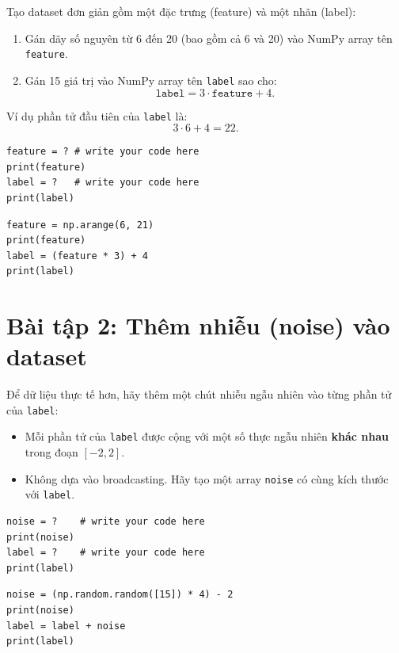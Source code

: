 \documentclass[12pt,a4paper]{article}
\begin{document}
\begin{phuongphap}[title={Yêu cầu bài tập}]
Tạo dataset đơn giản gồm một đặc trưng (feature) và một nhãn (label):
\begin{enumerate}
  \item Gán dãy số nguyên từ 6 đến 20 (bao gồm cả 6 và 20) vào NumPy array tên \texttt{feature}.
  \item Gán 15 giá trị vào NumPy array tên \texttt{label} sao cho:
  \[
    \texttt{label} = 3 \cdot \texttt{feature} + 4.
  \]
\end{enumerate}
Ví dụ phần tử đầu tiên của \texttt{label} là:
\[
  3 \cdot 6 + 4 = 22.
  \]
\end{phuongphap}

\begin{lstlisting}
feature = ? # write your code here
print(feature)
label = ?   # write your code here
print(label)
\end{lstlisting}

\begin{lstlisting}
feature = np.arange(6, 21)
print(feature)
label = (feature * 3) + 4
print(label)
\end{lstlisting}

\section{Bài tập 2: Thêm nhiễu (noise) vào dataset}

\begin{phuongphap}[title={Yêu cầu bài tập}]
Để dữ liệu thực tế hơn, hãy thêm một chút nhiễu ngẫu nhiên vào từng phần tử của \texttt{label}:
\begin{itemize}
  \item Mỗi phần tử của \texttt{label} được cộng với một số thực ngẫu nhiên \textbf{khác nhau} trong đoạn \([-2, 2]\).
  \item Không dựa vào broadcasting. Hãy tạo một array \texttt{noise} có cùng kích thước với \texttt{label}.
\end{itemize}
\end{phuongphap}

\begin{lstlisting}
noise = ?    # write your code here
print(noise)
label = ?    # write your code here
print(label)
\end{lstlisting}

\begin{lstlisting}
noise = (np.random.random([15]) * 4) - 2
print(noise)
label = label + noise
print(label)
\end{lstlisting}
\end{document}
